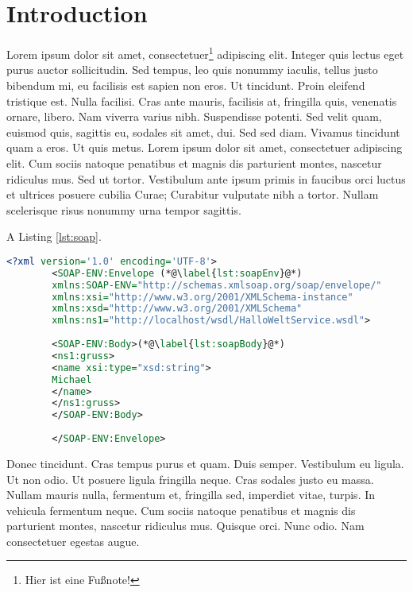 
\chapter{Introduction}

 Lorem ipsum dolor sit amet, consectetuer\footnote{Hier ist eine Fußnote!} adipiscing elit. Integer quis lectus eget purus auctor sollicitudin. Sed tempus, leo quis nonummy iaculis, tellus justo bibendum mi, eu facilisis est sapien non eros. Ut tincidunt. Proin eleifend tristique est. Nulla facilisi. Cras ante mauris, facilisis at, fringilla quis, venenatis ornare, libero. Nam viverra varius nibh. Suspendisse potenti. Sed velit quam, euismod quis, sagittis eu, sodales sit amet, dui. Sed sed diam. Vivamus tincidunt quam a eros. Ut quis metus. Lorem ipsum dolor sit amet, consectetuer adipiscing elit. Cum sociis natoque penatibus et magnis dis parturient montes, nascetur ridiculus mus. Sed ut tortor. Vestibulum ante ipsum primis in faucibus orci luctus et ultrices posuere cubilia Curae; Curabitur vulputate nibh a tortor. Nullam scelerisque risus nonummy urna tempor sagittis.

\noindent A Listing \ref{lst:soap}.

\begin{center}
	\begin{lstlisting}[caption={SOAP Anfrage an einen HalloWelt-Web-Service},label=lst:soap,language=XML,label={lst:soap}]
		<?xml version='1.0' encoding='UTF-8'>
		<SOAP-ENV:Envelope (*@\label{lst:soapEnv}@*)
		xmlns:SOAP-ENV="http://schemas.xmlsoap.org/soap/envelope/"
		xmlns:xsi="http://www.w3.org/2001/XMLSchema-instance"
		xmlns:xsd="http://www.w3.org/2001/XMLSchema"
		xmlns:ns1="http://localhost/wsdl/HalloWeltService.wsdl">
		
		<SOAP-ENV:Body>(*@\label{lst:soapBody}@*)
		<ns1:gruss>
		<name xsi:type="xsd:string">
		Michael
		</name>
		</ns1:gruss>
		</SOAP-ENV:Body>
		
		</SOAP-ENV:Envelope>
	\end{lstlisting}
\end{center}

Donec tincidunt. Cras tempus purus et quam. Duis semper. Vestibulum eu ligula. Ut non odio. Ut posuere ligula fringilla neque. Cras sodales justo eu massa. Nullam mauris nulla, fermentum et, fringilla sed, imperdiet vitae, turpis. In vehicula fermentum neque. Cum sociis natoque penatibus et magnis dis parturient montes, nascetur ridiculus mus. Quisque orci. Nunc odio. Nam consectetuer egestas augue.

